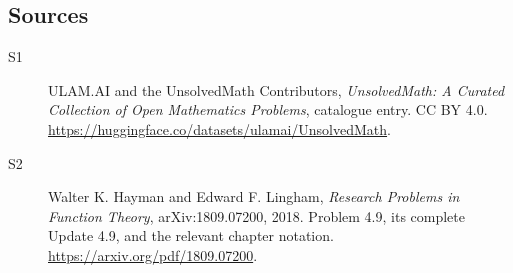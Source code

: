 \documentclass[11pt]{book}
\begin{document}
\subsection{Sources}
\begin{description}
\item[\hypertarget{source:statement:1}{S1}] ULAM.AI and the UnsolvedMath Contributors, \emph{UnsolvedMath: A Curated Collection of Open Mathematics Problems}, catalogue entry. CC BY 4.0. \url{https://huggingface.co/datasets/ulamai/UnsolvedMath}.
\item[\hypertarget{source:statement:2}{S2}] Walter K. Hayman and Edward F. Lingham, \emph{Research Problems in Function Theory}, arXiv:1809.07200, 2018. Problem 4.9, its complete Update 4.9, and the relevant chapter notation. \url{https://arxiv.org/pdf/1809.07200}.
\end{description}
\label{end:statement}
\end{document}
